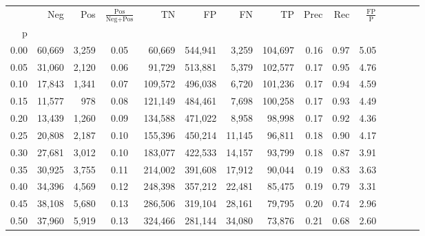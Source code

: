 \begin{tabular}{rrrcrrrrrrrrrrr}
\toprule
{} &     Neg &     Pos & $\frac{\text{Pos}}{\text{Neg}+\text{Pos}}$ &       TN &       FP &       FN &       TP &  Prec &   Rec & $\frac{\text{FP}}{\text{P}}$ \\
p    &         &         &                                            &          &          &          &          &       &       &                              \\
\midrule
0.00 &  60,669 &   3,259 &                                       0.05 &   60,669 &  544,941 &    3,259 &  104,697 &  0.16 &  0.97 &                         5.05 \\
0.05 &  31,060 &   2,120 &                                       0.06 &   91,729 &  513,881 &    5,379 &  102,577 &  0.17 &  0.95 &                         4.76 \\
0.10 &  17,843 &   1,341 &                                       0.07 &  109,572 &  496,038 &    6,720 &  101,236 &  0.17 &  0.94 &                         4.59 \\
0.15 &  11,577 &     978 &                                       0.08 &  121,149 &  484,461 &    7,698 &  100,258 &  0.17 &  0.93 &                         4.49 \\
0.20 &  13,439 &   1,260 &                                       0.09 &  134,588 &  471,022 &    8,958 &   98,998 &  0.17 &  0.92 &                         4.36 \\
0.25 &  20,808 &   2,187 &                                       0.10 &  155,396 &  450,214 &   11,145 &   96,811 &  0.18 &  0.90 &                         4.17 \\
0.30 &  27,681 &   3,012 &                                       0.10 &  183,077 &  422,533 &   14,157 &   93,799 &  0.18 &  0.87 &                         3.91 \\
0.35 &  30,925 &   3,755 &                                       0.11 &  214,002 &  391,608 &   17,912 &   90,044 &  0.19 &  0.83 &                         3.63 \\
0.40 &  34,396 &   4,569 &                                       0.12 &  248,398 &  357,212 &   22,481 &   85,475 &  0.19 &  0.79 &                         3.31 \\
0.45 &  38,108 &   5,680 &                                       0.13 &  286,506 &  319,104 &   28,161 &   79,795 &  0.20 &  0.74 &                         2.96 \\
0.50 &  37,960 &   5,919 &                                       0.13 &  324,466 &  281,144 &   34,080 &   73,876 &  0.21 &  0.68 &                         2.60 \\

\end{tabular}
